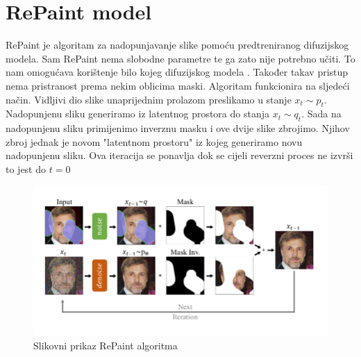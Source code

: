 \documentclass[10pt, a4paper, croatian]{article}
\begin{document}
\section{RePaint model}
RePaint je algoritam za nadopunjavanje slike pomoću predtreniranog difuzijskog modela. Sam RePaint nema slobodne parametre te ga zato nije
potrebno učiti. To nam omogućava korištenje bilo kojeg difuzijskog modela \cite{repaint}. Također takav pristup nema pristranost prema nekim oblicima maski.
Algoritam funkcionira na sljedeći način. Vidljivi dio slike unaprijednim prolazom preslikamo u stanje $x_t \sim p_t$. Nadopunjenu sliku 
generiramo iz latentnog prostora do stanja $x_t \sim q_t$. Sada na nadopunjenu sliku primijenimo inverznu masku i ove dvije slike zbrojimo. 
Njihov zbroj jednak je novom "latentnom prostoru" iz kojeg generiramo novu nadopunjenu sliku. Ova iteracija se ponavlja dok se cijeli reverzni
proces ne izvrši to jest do $t = 0$
\begin{figure}
	\begin{center}
	\includegraphics[width=\columnwidth]{images/repaint.png}
	\caption{Slikovni prikaz RePaint algoritma \cite{repaint}}
	\label{fig:figure2}
	\end{center}
\end{figure}
\end{document}
